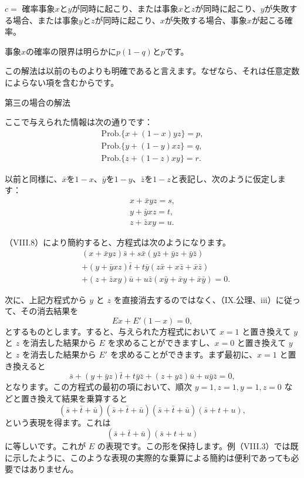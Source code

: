 \documentclass[a4paper,11pt,openany]{ltjsbook}
\begin{document}
$c =$ 確率\quad 事象$x$と$y$が同時に起こり、または事象$x$と$z$が同時に起こり、$y$が失敗する場合、または事象$y$と$z$が同時に起こり、$x$が失敗する場合、事象$x$が起こる確率。

事象$x$の確率の限界は明らかに$p(1-q)$と$p$です。

この解法は以前のものよりも明確であると言えます。なぜなら、それは任意定数によらない項を含むからです。

\begin{center}\textsc{第三の場合の解法}\end{center}

ここで与えられた情報は次の通りです：
\[
\begin{array}{cccccc}
  \text{Prob.} \{x + (1-x)yz\} = p, \\
  \text{Prob.} \{y + (1-y)xz\} = q, \\
  \text{Prob.} \{z + (1-z)xy\} = r.
\end{array}
\]

以前と同様に、$\bar{x}$を$1-x$、$\bar{y}$を$1-y$、$\bar{z}$を$1-z$と表記し、次のように仮定します：
\begin{align*}
  x + \bar{x}yz = s,  \\
  y + \bar{y}xz = t,  \\
  z + \bar{z}xy = u.
\end{align*}

（VIII.8）により簡約すると、方程式は次のようになります。
\setcounter{equation}{4}
\begin{equation}
\begin{split}
  &(x + \bar{x}yz)\bar{s}
+ s\bar{x}(y\bar{z} + \bar{y}z + \bar{y}\bar{z})
\\
  &+ (y + \bar{y}xz)\bar{t}
+ t\bar{y}(z\bar{x} + x\bar{z} + \bar{x}\bar{z})
\\
  &+ (z + \bar{z}xy)\bar{u}
+ u\bar{z}(x\bar{y} + \bar{x}y + \bar{x}\bar{y}) = 0.   %
\end{split}
\end{equation}

次に、上記方程式から $y$ と $z$ を直接消去するのではなく、（IX.公理、iii）に従って、その消去結果を
\begin{equation*}
Ex + E'(1-x) = 0,
\end{equation*}
とするものとします。すると、与えられた方程式において $x = 1$ と置き換えて $y$ と $z$ を消去した結果から $E$ を求めることができますし、$x = 0$ と置き換えて $y$ と $z$ を消去した結果から $E'$ を求めることができます。まず最初に、$x = 1$ と置き換えると
\[
\bar{s} + (y + \bar{y}z)\bar{t} + t\bar{y}\bar{z} + (z + y\bar{z})\bar{u} + u\bar{y}\bar{z} = 0,
\]
となります。この方程式の最初の項において、順次 $y = 1, z = 1, y = 1, z = 0$ などと置き換えて結果を乗算すると
\[
(\bar{s} + \bar{t} + \bar{u})(\bar{s} + \bar{t} + \bar{u})(\bar{s} + \bar{t} + \bar{u})(\bar{s} + t + u),
\]
という表現を得ます。これは
\[
(\bar{s} + \bar{t} + \bar{u})(\bar{s} + t + u)
\]
に等しいです。これが $E$ の表現です。この形を保持します。例（VIII.3）では既に示したように、このような表現の実際的な乗算による簡約は便利であっても必要ではありません。
\end{document}
